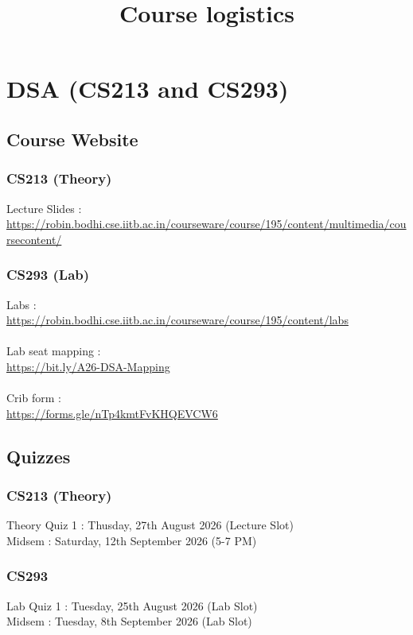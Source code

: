 \documentclass{article}
\title{Course logistics}
\date{}
\begin{document}
\maketitle


\section{DSA (CS213 and CS293)}

    \subsection{Course Website}

        \subsubsection{CS213 (Theory)}
        Lecture Slides : \\\url{https://robin.bodhi.cse.iitb.ac.in/courseware/course/195/content/multimedia/coursecontent/}

        \subsubsection{CS293 (Lab)}
        Labs : \\
        \url{https://robin.bodhi.cse.iitb.ac.in/courseware/course/195/content/labs}
        \\\\
        Lab seat mapping : \\\url{https://bit.ly/A26-DSA-Mapping}
        \\\\
        Crib form : \\\url{https://forms.gle/nTp4kmtFvKHQEVCW6 }
    \subsection{Quizzes}

        \subsubsection{CS213 (Theory)}
        Theory Quiz 1 : Thusday, 27th August 2026 (Lecture Slot)\\
        Midsem : Saturday, 12th September 2026 (5-7 PM)
        \subsubsection{CS293}
        Lab Quiz 1 : Tuesday, 25th August 2026 (Lab Slot)\\
        Midsem : Tuesday, 8th September 2026 (Lab Slot)
\end{document}

